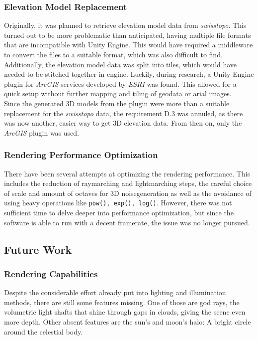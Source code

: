 \subsubsection{Elevation Model Replacement}
Originally, it was planned to retrieve elevation model data from \emph{swisstopo}. This turned out to be more problematic than anticipated, having multiple file formats that are incompatible with Unity Engine.
This would have required a middleware to convert the files to a suitable format, which was also difficult to find.
Additionally, the elevation model data was split into tiles, which would have needed to be stitched together in-engine.
\emptyline
Luckily, during research, a Unity Engine plugin for \emph{ArcGIS} services developed by \emph{ESRI} was found.
This allowed for a quick setup without further mapping and tiling of geodata or arial images.
\\
Since the generated 3D models from the plugin were more than a suitable replacement for the \emph{swisstopo} data, the requirement D.3 was annuled, as there was now another, easier way to get 3D elevation data.
From then on, only the \emph{ArcGIS} plugin was used.

\subsubsection{Rendering Performance Optimization}
There have been several attempts at optimizing the rendering performance.
This includes the reduction of \gls{raymarching} and \gls{lightmarching} steps, the careful choice of scale and amount of octaves for 3D \gls{noisegeneration} as well as the avoidance of using heavy operations like \lstinline[language=HLSL]{pow(), exp(), log()}.
However, there was not sufficient time to delve deeper into performance optimization, but since the software is able to run with a decent \gls{framerate}, the issue was no longer pursued.

\subsection{Future Work}
\label{section:project:futurework}
\subsubsection{Rendering Capabilities}
Despite the considerable effort already put into lighting and illumination methods, there are still some features missing.
One of those are god rays, the volumetric light shafts that shine through gaps in clouds, giving the scene even more depth.
Other absent features are the sun's and moon's halo: A bright circle around the celestial body.

